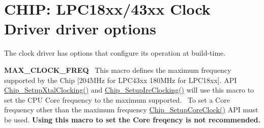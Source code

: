 \hypertarget{group___c_l_o_c_k__18_x_x__43_x_x___o_p_t_i_o_n_s}{}\section{C\+H\+IP\+: L\+P\+C18xx/43xx Clock Driver driver options}
\label{group___c_l_o_c_k__18_x_x__43_x_x___o_p_t_i_o_n_s}
The clock driver has options that configure it\textquotesingle{}s operation at build-\/time.~\newline


{\bfseries M\+A\+X\+\_\+\+C\+L\+O\+C\+K\+\_\+\+F\+R\+EQ}~\newline
 This macro defines the maximum frequency supported by the Chip \mbox{[}204\+M\+Hz for L\+P\+C43xx 180\+M\+Hz for L\+P\+C18xx\mbox{]}. A\+PI \hyperlink{group___s_u_p_p_o_r_t__18_x_x__43_x_x___f_u_n_c_ga18737e4a022570724c77c5cdea9c0258}{Chip\+\_\+\+Setup\+Xtal\+Clocking()} and \hyperlink{group___s_u_p_p_o_r_t__18_x_x__43_x_x___f_u_n_c_ga6eff97a8da15798119eada6c5f000404}{Chip\+\_\+\+Setup\+Irc\+Clocking()} will use this macro to set the C\+PU Core frequency to the maximum supported.~\newline
 To set a Core frequency other than the maximum frequency \hyperlink{group___s_u_p_p_o_r_t__18_x_x__43_x_x___f_u_n_c_ga54251628aeac543524d98d4db12c39f9}{Chip\+\_\+\+Setup\+Core\+Clock()} A\+PI must be used. {\bfseries Using this macro to set the Core freqency is not recommended.} 